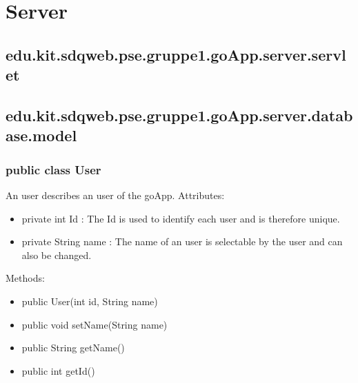 
\section{Server}
	\subsection{edu.kit.sdqweb.pse.gruppe1.goApp.server.servlet}
	
	\subsection{edu.kit.sdqweb.pse.gruppe1.goApp.server.database.model}

	\subsubsection{public class User}
	An user describes an user of the goApp.
	\newline Attributes:
	\begin{itemize}
	\item private int Id : The Id is used to identify each user and is therefore unique.
	\item private String name : The name of an user is selectable by the user and can also be changed.
	\end{itemize}
	Methods: 
	\begin{itemize}
	\item public User(int id, String name)
	\item public void setName(String name)
	\item public String getName()
	\item public int getId()
	\end{itemize}

